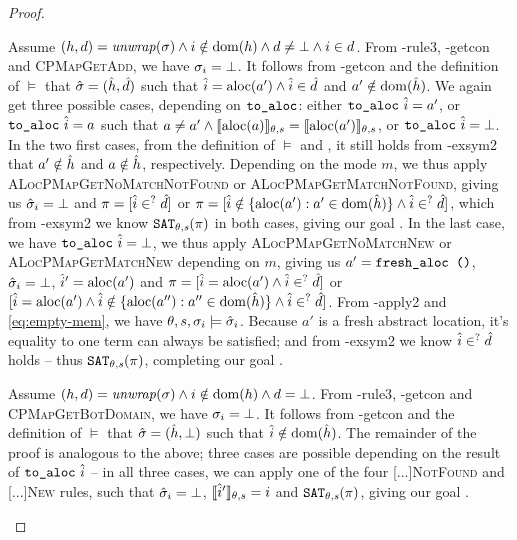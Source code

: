\begin{proof}

\begin{hypvlist}
 Assume $(h,d)={\operatorname{\mathit{unwrap}}}(\sigma) \land i\notin\operatorname{dom}(h) \land d\neq\bot \land i\in d$.
 From \hyp{rule3}, \hyp{getcon} and \textsc{CPMapGetAdd}, we have $\sigma_i=\bot$.
 It follows from \hyp{getcon} and the definition of $\models$ that $\hat{\sigma}=(\hat{h}, \hat{d})$ such that $\hat{i}=\text{aloc}(a') \land \hat{i} \in \hat{d}$ and $a'\notin \operatorname{dom}(\hat{h})$.
 We again get three possible cases, depending on $\texttt{to\_aloc}$: either $\texttt{to\_aloc}~\hat{i}=a'$, or $\texttt{to\_aloc}~\hat{i}=a$ such that $a\neq a'\land \llbracket\text{aloc}(a)\rrbracket_{\theta,s}=\llbracket\text{aloc}(a')\rrbracket_{\theta,s}$, or $\texttt{to\_aloc}~\hat{i}=\bot$.
 In the two first cases, from the definition of $\models$ and , it still holds from \hyp{exsym2} that $a'\notin \hat{h}$ and $a\notin \hat{h}$, respectively. Depending on the mode $m$, we thus apply \textsc{ALocPMapGetNoMatchNotFound} or \textsc{ALocPMapGetMatchNotFound}, giving us $\hat{\sigma}_i=\bot$ and $\pi=[\hat{i}\in^? \hat{d}]$ or $\pi=[\hat{i} \notin \{\text{aloc}(a'):a'\in \operatorname{dom}(\hat{h})\} \land \hat{i}\in^? \hat{d}]$, which from \hyp{exsym2} we know $\texttt{SAT}_{\mathit{\theta,s}}(\pi)$ in both cases, giving our goal .
 In the last case, we have $\texttt{to\_aloc}~\hat{i}=\bot$, we thus apply \textsc{ALocPMapGetNoMatchNew} or \textsc{ALocPMapGetMatchNew} depending on $m$, giving us $a'=\texttt{fresh\_aloc ()}$, $\hat{\sigma}_i=\bot$, $\hat{i}'=\text{aloc}(a')$ and $\pi=[\hat{i}=\text{aloc}(a') \land \hat{i}\in^? \hat{d}]$ or $[\hat{i}=\text{aloc}(a') \land \hat{i}\notin\{\text{aloc}(a''):a''\in \operatorname{dom}(\hat{h})\} \land \hat{i} \in^? \hat{d}]$. From \hyp{apply2} and \ref{eq:empty-mem}, we have $\theta,s,\sigma_i\models\hat{\sigma}_i$. Because $a'$ is a fresh abstract location, it's equality to one term can always be satisfied; and from \hyp{exsym2} we know $\hat{i}\in^?\hat{d}$ holds -- thus $\texttt{SAT}_{\mathit{\theta,s}}(\pi)$, completing our goal .
\end{hypvlist}


\begin{hypvlist}
 Assume $(h,d)={\operatorname{\mathit{unwrap}}}(\sigma) \land i\notin\operatorname{dom}(h) \land d=\bot$.
 From \hyp{rule3}, \hyp{getcon} and \textsc{CPMapGetBotDomain}, we have $\sigma_i=\bot$.
 It follows from \hyp{getcon} and the definition of $\models$ that $\hat{\sigma}=(\hat{h}, \bot)$ such that $\hat{i}\notin \operatorname{dom}(\hat{h})$.
 The remainder of the proof is analogous to the above; three cases are possible depending on the result of $\texttt{to\_aloc}~\hat{i}$ -- in all three cases, we can apply one of the four \textsc{[...]NotFound} and \textsc{[...]New} rules, such that $\hat{\sigma}_i=\bot$, $\llbracket\hat{i}'\rrbracket_{\theta,s}=i$ and $\texttt{SAT}_{\mathit{\theta,s}}(\pi)$, giving our goal .
\end{hypvlist}


\end{proof}
